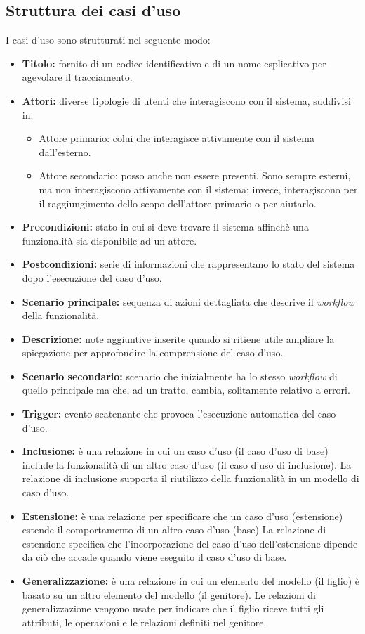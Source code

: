 \subsection{Struttura dei casi d'uso}
I casi d'uso sono strutturati nel seguente modo:
\begin{itemize}
	\item \textbf{Titolo:} fornito di un codice identificativo e di un nome esplicativo per agevolare il tracciamento.
	\item \textbf{Attori:} diverse tipologie di utenti che interagiscono con il sistema, suddivisi in:
	\begin{itemize}
		\item Attore primario: colui che interagisce attivamente con il sistema dall'esterno.
		\item Attore secondario: posso anche non essere presenti. 
		Sono sempre esterni, ma non interagiscono attivamente con il sistema; invece, interagiscono per il raggiungimento dello scopo dell'attore primario o per aiutarlo.
	\end{itemize}
	\item \textbf{Precondizioni:} stato in cui si deve trovare il sistema affinchè una funzionalità sia disponibile ad un attore.
	\item \textbf{Postcondizioni:} serie di informazioni che rappresentano lo stato del sistema dopo l'esecuzione del caso d'uso.
	\item \textbf{Scenario principale:} sequenza di azioni dettagliata che descrive il \textit{workflow} della funzionalità.
	\item \textbf{Descrizione:} note aggiuntive inserite quando si ritiene utile ampliare la spiegazione per approfondire la comprensione del caso d'uso.
	\item \textbf{Scenario secondario:} scenario che inizialmente ha lo stesso \textit{workflow} di quello principale ma che, ad un tratto, cambia, solitamente relativo a errori.
	\item \textbf{Trigger:} evento scatenante che provoca l'esecuzione automatica del caso d'uso.
	\item \textbf{Inclusione:} è una relazione in cui un caso d'uso (il caso d'uso di base) include la funzionalità di un altro caso d'uso (il caso d'uso di inclusione). 
		La relazione di inclusione supporta il riutilizzo della funzionalità in un modello di caso d'uso.
	\item \textbf{Estensione:} è una relazione per specificare che un caso d'uso (estensione) estende il comportamento di un altro caso d'uso (base)
	La relazione di estensione specifica che l'incorporazione del caso d'uso dell'estensione dipende da ciò che accade quando viene eseguito il caso d'uso di base.
	\item \textbf{Generalizzazione:} è una relazione in cui un elemento del modello (il figlio) è basato su un altro elemento del modello (il genitore). 
		Le relazioni di generalizzazione vengono usate per indicare che il figlio riceve tutti gli attributi, le operazioni e le relazioni definiti nel genitore.
\end{itemize}

